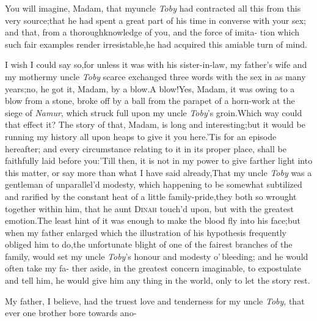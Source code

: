 \documentclass{article}
\begin{document}
You will imagine, Madam, that my\break uncle \textit{Toby} had
contracted all this from this very source;\tsk  that he had spent a great
part of his time in converse with your sex; and that, from a
thorough\break knowledge of you, and the force of imita- tion which such
fair examples render irresistable,\tsk he had acquired this amiable
turn of mind.

I wish I could say so,\tsk  for unless it was with his
sister-in-law, my father’s wife and my mother\tsh  my
uncle \textit{Toby} scarce exchanged three words with the sex in as
many years;\tsh  no, he got it, Madam, by a
blow.\tsh  A blow!\tsk  Yes, Madam, it was owing to a
blow from a stone, broke off by a ball from the parapet of a
horn-work at the siege of \textit{Namur}, which struck full upon my uncle
\textit{Toby}’s groin.\tsk  Which way could that effect it?
The story of that, Madam, is long and interesting;\tsk  but it
would be running my history all upon heaps to give it you
here.\tsh  ’Tis for an episode hereafter; and every
circumstance relating to it in its proper place, shall be
faithfully laid before you:\tsk  ’Till then, it is not in my
power to give farther light into this matter, or say more than what I have said
already,\tsk  That my uncle \textit{Toby} was\break
a gentleman of unparallel’d modesty,\break
which happening to be somewhat
subtilized and rarified by the constant heat of a little
family-pride,\tsk  they
both so wrought together within him, that he
aunt \textsc{Dinah} touch’d upon, but with the greatest
emotion.\tsk  The least
hint of it was enough to make the blood fly into his face;\tsk  but when my father
enlarged
which the illustration of his hypothesis
frequently obliged him to do,\tsh  the un\-fortunate blight of one of the fairest
branches of the family, would set my uncle \textit{Toby}’s honour and modesty
o’\,bleed\-ing; and he would often take my fa- ther aside, in the greatest concern
imaginable, to expostulate and tell him, he would give him any thing in the world,
only to let the story rest.

My father, I believe, had the truest love and tenderness for my uncle \textit{Toby},
that ever one brother bore towards ano-\break
{}
\end{document}
